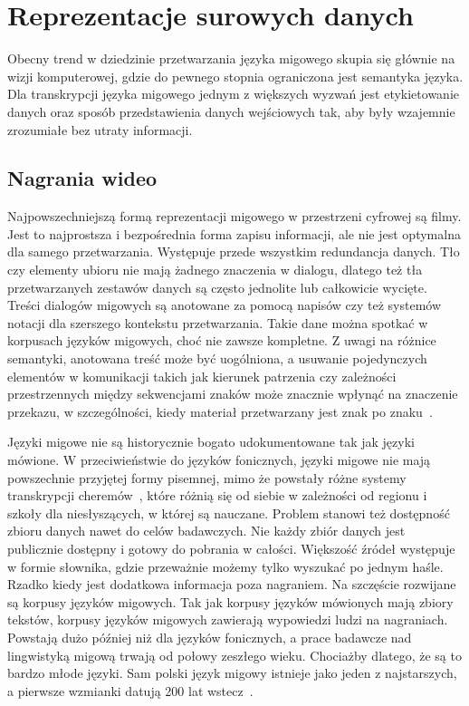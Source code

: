 \section{Reprezentacje surowych danych}
\label{sec:raw-data-representations}

Obecny trend w dziedzinie przetwarzania języka migowego skupia się głównie na wizji komputerowej, gdzie do pewnego stopnia ograniczona jest semantyka języka. Dla transkrypcji języka migowego jednym z większych wyzwań jest etykietowanie danych oraz sposób przedstawienia danych wejściowych tak, aby były wzajemnie zrozumiałe bez utraty informacji.

\subsection{Nagrania wideo}
\label{subsec:video-recordings}

Najpowszechniejszą formą reprezentacji migowego w przestrzeni cyfrowej są filmy. Jest to najprostsza i bezpośrednia forma zapisu informacji, ale nie jest optymalna dla samego przetwarzania. Występuje przede wszystkim redundancja danych. Tło czy elementy ubioru nie mają żadnego znaczenia w dialogu, dlatego też tła przetwarzanych zestawów danych są często jednolite lub całkowicie wycięte. Treści dialogów migowych są anotowane za pomocą napisów czy też systemów notacji dla szerszego kontekstu przetwarzania. Takie dane można spotkać w korpusach języków migowych, choć nie zawsze kompletne. Z uwagi na różnice semantyki, anotowana treść może być uogólniona, a usuwanie pojedynczych elementów w komunikacji takich jak kierunek patrzenia czy zależności przestrzennych między sekwencjami znaków może znacznie wpłynąć na znaczenie przekazu, w szczególności, kiedy materiał przetwarzany jest znak po znaku~\cite{yin2020}.

Języki migowe nie są historycznie bogato udokumentowane tak jak języki mówione. W przeciwieństwie do języków fonicznych, języki migowe nie mają powszechnie przyjętej formy pisemnej, mimo że powstały różne systemy transkrypcji cheremów~\cite{stokoe1966}, które różnią się od siebie w zależności od regionu i szkoły dla niesłyszących, w której są nauczane. Problem stanowi też dostępność zbioru danych nawet do celów badawczych. Nie każdy zbiór danych jest publicznie dostępny i gotowy do pobrania w całości. Większość źródeł występuje w formie słownika, gdzie przeważnie możemy tylko wyszukać po jednym haśle. Rzadko kiedy jest dodatkowa informacja poza nagraniem. Na szczęście rozwijane są korpusy języków migowych. Tak jak korpusy języków mówionych mają zbiory tekstów, korpusy języków migowych zawierają wypowiedzi ludzi na nagraniach. Powstają dużo później niż dla języków fonicznych, a prace badawcze nad lingwistyką migową trwają od połowy zeszłego wieku. Chociażby dlatego, że są to bardzo młode języki. Sam polski język migowy istnieje jako jeden z najstarszych, a pierwsze wzmianki datują 200 lat wstecz~\cite{hollak1879}.

